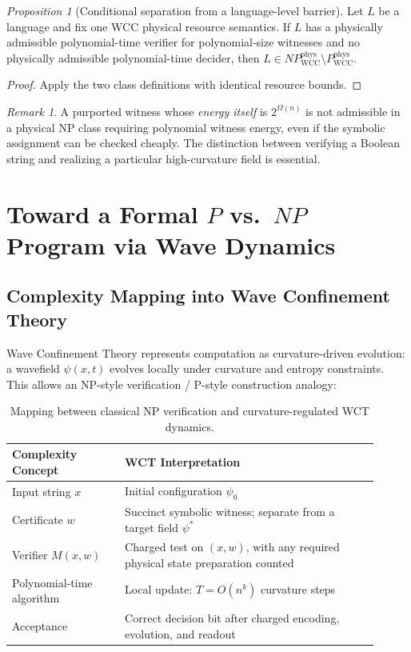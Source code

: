 \documentclass[12pt]{article}
\theoremstyle{remark}
\newtheorem*{remark}{Remark}
\newtheorem{proposition}[theorem]{Proposition}
\begin{document}
\begin{proposition}[Conditional separation from a language-level barrier]
\label{thm:np-type-conditional}
Let $L$ be a language and fix one WCC physical resource semantics.
If $L$ has a physically admissible polynomial-time verifier for
polynomial-size witnesses and no physically admissible polynomial-time
decider, then
$L\in NP_{\mathrm{WCC}}^{\mathrm{phys}}
\setminus P_{\mathrm{WCC}}^{\mathrm{phys}}$.
\end{proposition}
\begin{proof}
Apply the two class definitions with identical resource bounds.
\end{proof}

\begin{remark}
A purported witness whose \emph{energy itself} is
$2^{\Omega(n)}$ is not admissible in a physical NP class requiring
polynomial witness energy, even if the symbolic assignment can be
checked cheaply. The distinction between verifying a Boolean string
and realizing a particular high-curvature field is essential.
\end{remark}

\section{Toward a Formal $P$ vs.\ $NP$ Program via Wave Dynamics}
\label{sec:pvnp-program}

\subsection{Complexity Mapping into Wave Confinement Theory}

Wave Confinement Theory represents computation as curvature-driven evolution:
a wavefield $\psi(x,t)$ evolves locally under curvature and entropy constraints.
This allows an NP-style verification / P-style construction analogy:

\begin{table}[h]
\centering
\begin{tabular}{|p{0.28\linewidth}|p{0.63\linewidth}|}
\hline
\textbf{Complexity Concept} & \textbf{WCT Interpretation} \\ \hline
Input string $x$              & Initial configuration $\psi_0$ \\ \hline
Certificate $w$               & Succinct symbolic witness; separate from a target field $\psi^*$ \\ \hline
Verifier $M(x,w)$             & Charged test on $(x,w)$, with any required physical state preparation counted \\ \hline
Polynomial-time algorithm     & Local update: $T = O(n^k)$ curvature steps \\ \hline
Acceptance                    & Correct decision bit after charged encoding, evolution, and readout \\ \hline
\end{tabular}
\caption{Mapping between classical NP verification and curvature-regulated WCT dynamics.}
\end{table}
\end{document}
